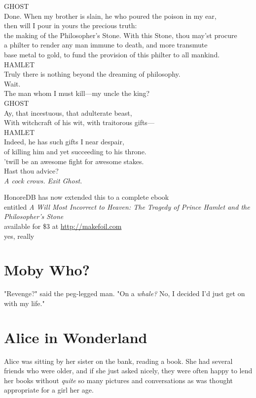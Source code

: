 \noindent{}GHOST\\
Done. When my brother is slain, he who poured the poison in my ear,\\
then will I pour in yours the precious truth:\\
the making of the Philosopher's Stone. With this Stone, thou may'st procure\\
a philter to render any man immune to death, and more transmute\\
base metal to gold, to fund the provision of this philter to all mankind.\\

\noindent{}HAMLET\\
Truly there is nothing beyond the dreaming of philosophy.\\
Wait.\\
The man whom I must kill---my uncle the king?\\

\noindent{}GHOST\\
Ay, that incestuous, that adulterate beast,\\
With witchcraft of his wit, with traitorous gifts---\\

\noindent{}HAMLET\\
Indeed, he has such gifts I near despair,\\
of killing him and yet succeeding to his throne.\\
'twill be an awesome fight for awesome stakes.\\
Hast thou advice?\\

\emph{A cock crows. Exit Ghost.}

\begin{center}
HonoreDB has now extended this to a complete ebook\\
entitled \emph{A Will Most Incorrect to Heaven: The Tragedy of Prince Hamlet and
the Philosopher's Stone}\\
available for \$3 at \url{http://makefoil.com}\\
yes, really
\end{center}
\section{Moby Who?}
"Revenge?" said the peg-legged man. "On a \emph{whale?} No, I decided I'd just
get on with my life."
\section{Alice in Wonderland}
Alice was sitting by her sister on the bank, reading a book. She had several
friends who were older, and if she just asked nicely, they were often happy to
lend her books without \emph{quite} so many pictures and conversations as was
thought appropriate for a girl her age.

